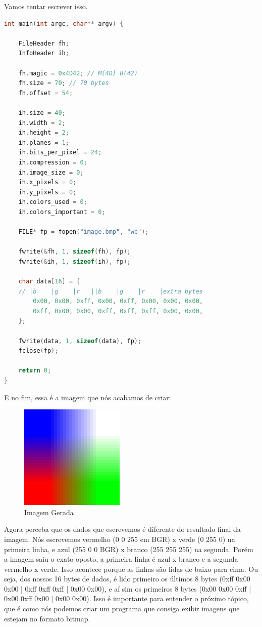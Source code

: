 \documentclass[a4paper,oneside,12pt]{article}
\begin{document}
Vamos tentar escrever isso.
\begin{lstlisting}[language=C, caption=Escrevendo um Bitmap]
int main(int argc, char** argv) {

    FileHeader fh;
    InfoHeader ih;

    fh.magic = 0x4D42; // M(4D) B(42)
    fh.size = 70; // 70 bytes
    fh.offset = 54;

    ih.size = 40;
    ih.width = 2;
    ih.height = 2;
    ih.planes = 1;
    ih.bits_per_pixel = 24;
    ih.compression = 0;
    ih.image_size = 0;
    ih.x_pixels = 0;
    ih.y_pixels = 0;
    ih.colors_used = 0;
    ih.colors_important = 0;

    FILE* fp = fopen("image.bmp", "wb");

    fwrite(&fh, 1, sizeof(fh), fp);
    fwrite(&ih, 1, sizeof(ih), fp);

    char data[16] = {
    // |b    |g    |r   ||b    |g    |r    |extra bytes
        0x00, 0x00, 0xff, 0x00, 0xff, 0x00, 0x00, 0x00,
        0xff, 0x00, 0x00, 0xff, 0xff, 0xff, 0x00, 0x00,
    };

    fwrite(data, 1, sizeof(data), fp);
    fclose(fp);

    return 0;
}
\end{lstlisting}

E no fim, essa é a imagem que nós acabamos de criar:
\begin{figure}[h]
    \centering
    \includegraphics[width=5cm, interpolate=false]{media/image.png}
    \caption{Imagem Gerada}
\end{figure}
\break

Agora perceba que os dados que escrevemos é diferente do resultado final da imagem.
Nós escrevemos vermelho (0 0 255 em BGR) x verde (0 255 0) na primeira linha, e azul (255 0 0 BGR) x branco (255 255 255) na segunda. Porém a imagem saiu o exato oposto, a primeira linha é azul x branco e a segunda vermelho x verde. Isso acontece porque as linhas são lidas de baixo para cima.
Ou seja, dos nossos 16 bytes de dados, é lido primeiro os últimos 8 bytes (0xff 0x00 0x00 | 0xff 0xff 0xff | 0x00 0x00), e aí sim os primeiros 8 bytes (0x00 0x00 0xff | 0x00 0xff 0x00 | 0x00 0x00).
Isso é importante para entender o próximo tópico, que é como nós podemos criar um programa que consiga exibir imagens que estejam no formato bitmap.
\end{document}
